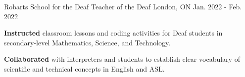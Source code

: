 

\begin{cventries}


  \cventry
    {Robarts School for the Deaf} %
    {Teacher of the Deaf} %
    {London, ON} %
    {Jan. 2022 - Feb. 2022} %
    {
      \begin{cvitems} %
        \item {\textbf{Instructed} classroom lessons and coding activities for Deaf students in secondary-level Mathematics, Science, and Technology.}
        \item {\textbf{Collaborated} with interpreters and students to establish clear vocabulary of scientific and technical concepts in English and ASL.}
      \end{cvitems}
    }
    

    


\end{cventries}
